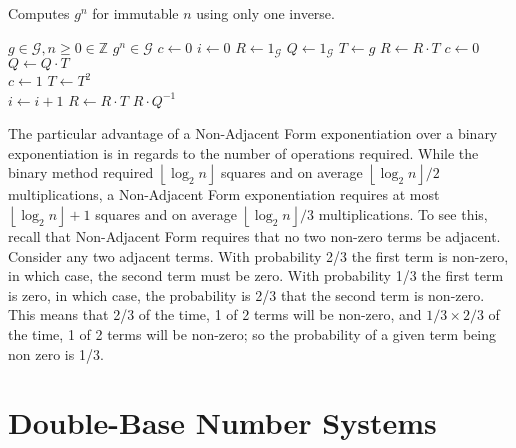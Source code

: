 \documentclass{ucalgthes1}
\theoremstyle{plain}
\theoremstyle{definition}
\newcommand{\ZZ}{\mathbb{Z}}
\newcommand{\floor}[1]{\left\lfloor #1 \right\rfloor}
\begin{document}
\begin{algorithm}[h]
\caption{Computes $g^n$ for immutable $n$ using only one inverse.}\label{alg:nafR2LImmutable}
\begin{algorithmic}[1]
\REQUIRE $g \in \mathcal G, n \ge 0 \in \ZZ$
\ENSURE $g^n \in \mathcal G$
\STATE $c \gets 0$ 
\STATE $i \gets 0$
\STATE $R \gets 1_{\mathcal G}$ 
\STATE $Q \gets 1_{\mathcal G}$ 
\STATE $T \gets g$ 
	\IF {$\floor{n/2^i}+c \equiv 1 \pmod 4$}
		\STATE $R \gets R \cdot T$
		\STATE $c \gets 0$
	\ELSIF {$\floor{n/2^i}+c \equiv 3 \pmod 4$}
		\STATE $Q \gets Q \cdot T$ \\
		\STATE $c \gets 1$
	\ENDIF
	\STATE $T \gets T^2$ \\
	\STATE $i \gets i+1$
\ENDWHILE
{} \STATE $R \gets R \cdot T$ \ENDIF
\RETURN $R \cdot Q^{-1}$
\end{algorithmic}
\end{algorithm}

The particular advantage of a Non-Adjacent Form exponentiation over a binary exponentiation is in regards to the number of operations required.  While the binary method required $\floor{\log_2 n}$ squares and on average $\floor{\log_2 n}/2$ multiplications, a Non-Adjacent Form exponentiation requires at most $\floor{\log_2 n}+1$ squares and on average $\floor{\log_2 n}/3$ multiplications.  To see this, recall that Non-Adjacent Form requires that no two non-zero terms be adjacent.  Consider any two adjacent terms.  With probability 2/3 the first term is non-zero, in which case, the second term must be zero.  With probability 1/3 the first term is zero, in which case, the probability is 2/3 that the second term is non-zero.  This means that 2/3 of the time, 1 of 2 terms will be non-zero, and $1/3 \times 2/3$ of the time, 1 of 2 terms will be non-zero; so the probability of a given term being non zero is 1/3.


\bigbreak
\section{Double-Base Number Systems}\label{section:dbns}
\end{document}
